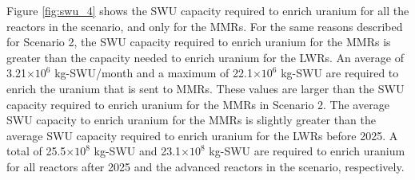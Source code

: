 Figure \ref{fig:swu_4} shows the \gls{SWU} capacity required to 
enrich uranium for all the reactors in the scenario, and 
only for the \glspl{MMR}. For the same reasons described for 
Scenario 2, the \gls{SWU} capacity required to enrich uranium 
for the \glspl{MMR} is greater than the capacity needed to 
enrich uranium for the \glspl{LWR}. An average of 3.21$\times 10^6$ 
kg-\gls{SWU}/month and a maximum of 22.1$\times 10^6$ kg-\gls{SWU}
are required to enrich the uranium that is sent to \glspl{MMR}. These values 
are larger than the \gls{SWU} 
capacity required to enrich uranium for the \glspl{MMR} in 
Scenario 2. The average \gls{SWU} capacity to enrich uranium for 
the \glspl{MMR} is slightly greater than the average \gls{SWU} 
capacity required to enrich uranium for the \glspl{LWR} before 2025. 
A total of 25.5$\times 10^8$ kg-SWU and 23.1$\times 10^8$
kg-SWU are required to enrich uranium for all reactors after 2025 and the advanced 
reactors in the scenario, respectively. 

